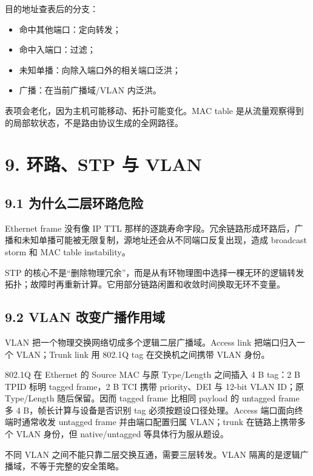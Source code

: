 \documentclass[UTF8,fontset=none,11pt,a4paper]{ctexart}
\providecommand{\tightlist}{\setlength{\itemsep}{0pt}\setlength{\parskip}{0pt}}
\begin{document}
目的地址查表后的分支：

\begin{itemize}
\tightlist
\item
  命中其他端口：定向转发；
\item
  命中入端口：过滤；
\item
  未知单播：向除入端口外的相关端口泛洪；
\item
  广播：在当前广播域/VLAN 内泛洪。
\end{itemize}

表项会老化，因为主机可能移动、拓扑可能变化。MAC table
是从流量观察得到的局部软状态，不是路由协议生成的全网路径。

\section{9. 环路、STP 与 VLAN}\label{8-ux73afux8defstp-ux4e0e-vlan}

\subsection{9.1
为什么二层环路危险}\label{81-ux4e3aux4ec0ux4e48ux4e8cux5c42ux73afux8defux5371ux9669}

Ethernet frame 没有像 IP TTL
那样的逐跳寿命字段。冗余链路形成环路后，广播和未知单播可能被无限复制，源地址还会从不同端口反复出现，造成
broadcast storm 和 MAC table instability。

STP
的核心不是``删除物理冗余''，而是从有环物理图中选择一棵无环的逻辑转发拓扑；故障时再重新计算。它用部分链路闲置和收敛时间换取无环不变量。

\subsection{9.2 VLAN
改变广播作用域}\label{82-vlan-ux6539ux53d8ux5e7fux64adux4f5cux7528ux57df}

VLAN 把一个物理交换网络切成多个逻辑二层广播域。Access link
把端口归入一个 VLAN；Trunk link 用 802.1Q tag 在交换机之间携带 VLAN
身份。

802.1Q 在 Ethernet 的 Source MAC 与原 Type/Length 之间插入 4 B tag：2 B TPID 标明 tagged frame，2 B TCI 携带 priority、DEI 与 12-bit VLAN ID；原 Type/Length 随后保留。因而 tagged frame 比相同 payload 的 untagged frame 多 4 B，帧长计算与设备是否识别 tag 必须按题设口径处理。Access 端口面向终端时通常收发 untagged frame 并由端口配置归属 VLAN；trunk 在链路上携带多个 VLAN 身份，但 native/untagged 等具体行为服从题设。

不同 VLAN 之间不能只靠二层交换互通，需要三层转发。VLAN
隔离的是逻辑广播域，不等于完整的安全策略。
\end{document}
